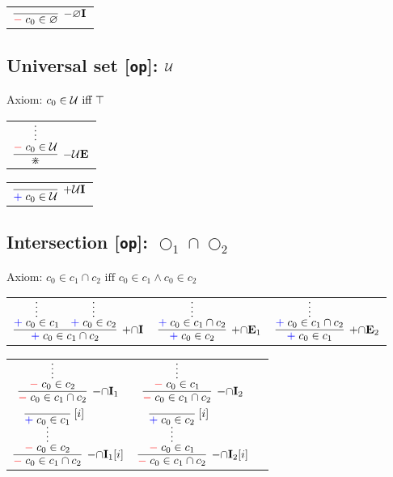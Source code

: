 \documentclass[11pt]{article}
\begin{document}
\noindent
\begin{tabular}{c}
$
\infer[\DenyRule{\varnothing}\Intro{}]{
	\Deny{c_0\in\varnothing}}{}
$
\end{tabular}
\bigskip



\subsection*{Universal set [\texttt{op}]: $\mathcal U$}

\smallskip
\noindent
Axiom: $c_0 \in \mathcal U\text{ iff }\top$
\smallskip

\noindent
\begin{tabular}{c}
$
\infer[\DenyRule{\Universal}\Elim{}]{\divideontimes}{
	\infer*{\Deny{c_0\in\Universal}}{}
}
$
\end{tabular}
\bigskip

\noindent
\begin{tabular}{c}
$
\infer[\AssertRule{\Universal}\Intro{}]{
	\Assert{c_0\in\Universal}}{}
$
\end{tabular}
\bigskip


\newpage
\subsection*{Intersection [\texttt{op}]: $\bigcirc_1\cap\bigcirc_2$}

\smallskip
\noindent
Axiom: $c_0\in c_1\cap c_2\text{ iff }c_0\in c_1\land c_0\in c_2$
\smallskip

\noindent
\begin{tabular}{ccc}
$
\infer[\AssertRule{\cap}\Intro{}]{\Assert{c_0\in c_1\cap c_2}}{
	\infer*{\Assert{c_0\in c_1}}{}
	& 
	\infer*{\Assert{c_0\in c_2}}{}
}
$
\hspace{1cm}
&
$
\infer[\AssertRule{\cap}\Elim{1}]{\Assert{c_0\in c_2}}{
	\infer*{\Assert{c_0\in c_1\cap c_2}}{}
}
$
\hspace{1cm}
&
$
\infer[\AssertRule{\cap}\Elim{2}]{\Assert{c_0\in c_1}}{
	\infer*{\Assert{c_0\in c_1\cap c_2}}{}
}
$
\end{tabular}
\bigskip

\noindent
\begin{tabular}{ccc}
$
\infer[\DenyRule{\cap}\Intro{1}]{\Deny{c_0\in c_1\cap c_2}}{
	\infer*{\Deny{c_0\in c_2}}{}
}
$
\hspace{1cm}
&
$
\infer[\DenyRule{\cap}\Intro{2}]{\Deny{c_0\in c_1\cap c_2}}{
	\infer*{\Deny{c_0\in c_1}}{}
}
$
\hspace{1cm}
\\[5mm]
$
\infer[\DenyRule{\cap}\Intro{1}{[{i}]}]{\Deny{c_0\in c_1\cap c_2}}{
	\infer*{\Deny{c_0\in c_2}}{\infer[\Label{i}]{\Assert{c_0\in c_1}}{}}
}
$
\hspace{1cm}
&
$
\infer[\DenyRule{\cap}\Intro{2}{[{i}]}]{\Deny{c_0\in c_1\cap c_2}}{
	\infer*{\Deny{c_0\in c_1}}{\infer[\Label{i}]{\Assert{c_0\in c_2}}{}}
}
$
\end{tabular}
\bigskip
\end{document}
